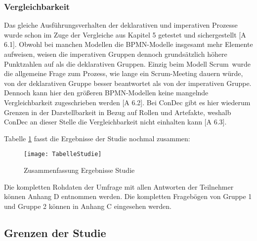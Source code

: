 \subsubsection{Vergleichbarkeit}
Das gleiche Ausführungsverhalten der deklarativen und imperativen Prozesse wurde schon im Zuge der Vergleiche aus Kapitel 5 getestet und sichergestellt [A 6.1]. \newline
Obwohl bei manchen Modellen die BPMN-Modelle insgesamt mehr Elemente aufweisen, weisen die imperativen Gruppen dennoch grundsätzlich höhere Punktzahlen auf als die deklarativen Gruppen. Einzig beim Modell \grqq Scrum\grqq \ wurde die allgemeine Frage zum Prozess, wie lange ein Scrum-Meeting dauern würde, von der deklarativen Gruppe besser beantwortet als von der imperativen Gruppe. Dennoch kann hier den größeren BPMN-Modellen keine mangelnde Vergleichbarkeit zugeschrieben werden [A 6.2].\newline
Bei ConDec gibt es hier wiederum Grenzen in der Darstellbarkeit in Bezug auf Rollen und Artefakte, weshalb ConDec an dieser Stelle die Vergleichbarkeit nicht einhalten kann [A 6.3].\newline


Tabelle \ref{fig:TabelleStudie} fasst die Ergebnisse der Studie nochmal zusammen:

\begin{figure}[htp]
\begin{center}
  \texttt{[image: TabelleStudie]} %
  \caption{Zusammenfassung Ergebnisse Studie}
  \label{fig:TabelleStudie}
\end{center}
\end{figure}

Die kompletten Rohdaten der Umfrage mit allen Antworten der Teilnehmer können Anhang D entnommen werden. Die kompletten Fragebögen von Gruppe 1 und Gruppe 2 können in Anhang C eingesehen werden.\newline

\subsection{Grenzen der Studie}

